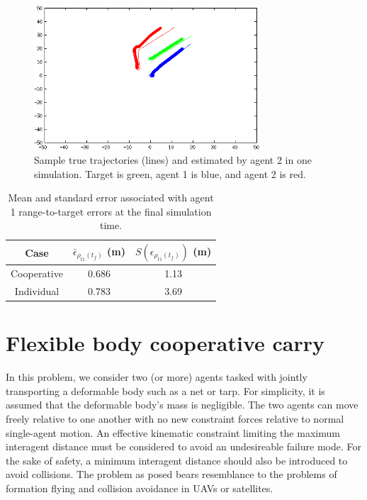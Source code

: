 \documentclass{aiaa-tc}
\begin{document}
\begin{figure}
\centering
\includegraphics[width=0.75\textwidth]{sample_traj.png}
\caption{ Sample true trajectories (lines) and estimated by agent 2 in one simulation. Target is green, agent 1 is blue, and agent 2 is red. }
\label{fig:sample_traj}
\end{figure}

\begin{table}
\centering
\begin{tabular}{|c|c|c|}
\hline
Case & $\bar{\epsilon}_{\rho_{t1}(t_f)}$ (m) &  $S(\epsilon_{\rho_{t1}(t_f)})$ (m)\\
\hline
Cooperative & 0.686 & 1.13\\
\hline
Individual & 0.783 & 3.69\\
\hline
\end{tabular}
\caption{Mean and standard error associated with agent 1 range-to-target errors at the final simulation time.}
\label{tab:mean_std_errs}
\end{table}

\section{Flexible body cooperative carry}

In this problem, we consider two (or more) agents tasked with jointly transporting a deformable body such as a net or tarp. For simplicity, it is assumed that the deformable body's mass is negligible. The two agents can move freely relative to one another with no new constraint forces relative to normal single-agent motion. An effective kinematic constraint limiting the maximum interagent distance must be considered to avoid an undesireable failure mode. For the sake of safety, a minimum interagent distance should also be introduced to avoid collisions. The problem as posed bears resemblance to the problems of formation flying and collision avoidance in UAVs or satellites.
\end{document}
